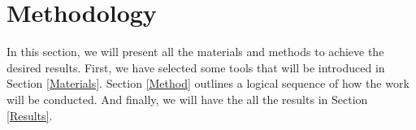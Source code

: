 \section{Methodology}

In this section, we will present all the materials and methods to achieve the desired results. First, we have selected some tools that will be introduced in Section \ref{Materials}. Section \ref{Method} outlines a logical sequence of how the work will be conducted. And finally, we will have the all the results in Section \ref{Results}.
